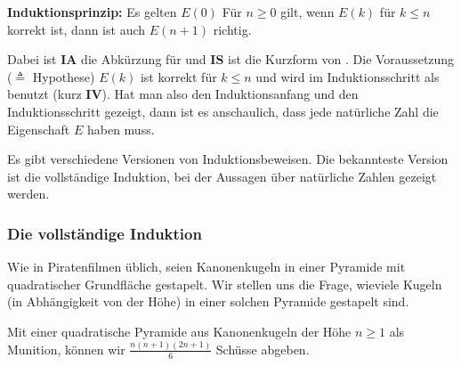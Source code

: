 \noindent\textbf{Induktionsprinzip:} Es gelten
\indudef%
{$E(0)$}%
{Für $n \ge 0$ gilt, wenn $E(k)$ für $k \le n$ korrekt ist,
dann ist auch $E(n+1)$ richtig.}
\medskip

Dabei ist \textbf{\textsf{IA}} die Abkürzung für
 und \textbf{\textsf{IS}} ist die Kurzform von
. Die Voraussetzung ($\triangleq$ Hypothese)
$E(k)$ ist korrekt für $k \le n$ und wird im Induktionsschritt
als  benutzt
(kurz \textbf{\textsf{IV}}). Hat man also den Induktionsanfang und den
Induktionsschritt gezeigt, dann ist es anschaulich, dass jede natürliche Zahl die
Eigenschaft $E$ haben muss.

Es gibt verschiedene Versionen von Induktionsbeweisen. Die bekannteste
Version ist die vollständige Induktion, bei der Aussagen über
natürliche Zahlen gezeigt werden.

\subsubsection{Die vollständige Induktion}

Wie in Piratenfilmen üblich, seien Kanonenkugeln in einer Pyramide mit
quadratischer Grundfläche gestapelt. Wir stellen uns die Frage,
wieviele Kugeln (in Abhängigkeit von der Höhe) in einer solchen
Pyramide gestapelt sind.

\begin{theorem}
\label{Pyramid}
Mit einer quadratische Pyramide aus Kanonenkugeln der Höhe $n \ge 1$
als Munition, können wir $\frac{n(n+1)(2n+1)}{6}$ Schüsse abgeben.
\end{theorem}

